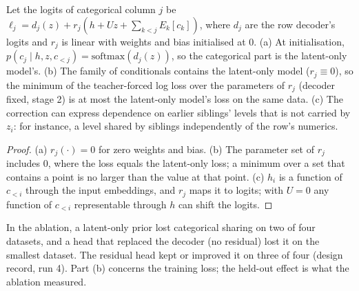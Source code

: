 \setcounter{proposition}{1860}
\begin{proposition}\label{prop:ctvaeres}
Let the logits of categorical column $j$ be $\ell_j=d_j(z)+r_j(h+Uz+\textstyle\sum_{k<j}E_k[c_k])$, where $d_j$ are the row decoder's logits and $r_j$ is linear with weights and bias initialised at $0$. (a) At initialisation, $p(c_j\mid h,z,c_{<j})=\mathrm{softmax}(d_j(z))$, so the categorical part is the latent-only model's. (b) The family of conditionals contains the latent-only model ($r_j\equiv0$), so the minimum of the teacher-forced log loss over the parameters of $r_j$ (decoder fixed, stage 2) is at most the latent-only model's loss on the same data. (c) The correction can express dependence on earlier siblings' levels that is not carried by $z_i$: for instance, a level shared by siblings independently of the row's numerics.
\end{proposition}
\begin{proof}
(a) $r_j(\cdot)=0$ for zero weights and bias. (b) The parameter set of $r_j$ includes $0$, where the loss equals the latent-only loss; a minimum over a set that contains a point is no larger than the value at that point. (c) $h_i$ is a function of $c_{<i}$ through the input embeddings, and $r_j$ maps it to logits; with $U=0$ any function of $c_{<i}$ representable through $h$ can shift the logits.
\end{proof}
\noindent In the ablation, a latent-only prior lost categorical sharing on two of four datasets, and a head that replaced the decoder (no residual) lost it on the smallest dataset. The residual head kept or improved it on three of four (design record, run 4). Part (b) concerns the training loss; the held-out effect is what the ablation measured.

